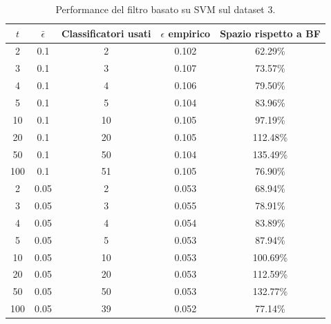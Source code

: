 \begin{table}
    \centering
    \begin{tabular}{|c|c|c|c|c|}
        \hline
        $t$ & $\bar\epsilon$ & Classificatori usati & $\epsilon$ empirico & Spazio rispetto a BF \\ 
        \hline
        2  & 0.1  & 2  & 0.102 & 62.29\% \\  
        3  & 0.1  & 3  & 0.107 & 73.57\% \\  
        4  & 0.1  & 4  & 0.106 & 79.50\% \\  
        5  & 0.1  & 5  & 0.104 & 83.96\% \\  
        10 & 0.1  & 10 & 0.105 & 97.19\% \\ 
        20 & 0.1  & 20 & 0.105 & 112.48\% \\ 
        50 & 0.1  & 50 & 0.104 & 135.49\% \\ 
        100 & 0.1 & 51 & 0.105 & 76.90\% \\  
        2  & 0.05 & 2  & 0.053 & 68.94\% \\  
        3  & 0.05 & 3  & 0.055 & 78.91\% \\  
        4  & 0.05 & 4  & 0.054 & 83.89\% \\  
        5  & 0.05 & 5  & 0.053 & 87.94\% \\  
        10 & 0.05 & 10 & 0.053 & 100.69\% \\ 
        20 & 0.05 & 20 & 0.053 & 112.59\% \\ 
        50 & 0.05 & 50 & 0.053 & 132.77\% \\ 
        100 & 0.05 & 39 & 0.052 & 77.14\% \\  
        \hline
    \end{tabular}
    \caption{Performance del filtro basato su SVM sul dataset 3.}
    \label{tab:performance-ds3-svm}
\end{table}
